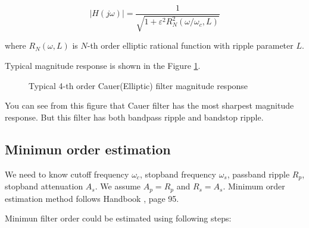 \begin{equation}
 |H(j\omega)|=\frac{1}{\sqrt{1+\varepsilon^2 R^2_N(\omega/\omega_c,L)}}
\end{equation}

where $R_N(\omega,L)$ is $N$-th order elliptic rational function with ripple
parameter $L$.

Typical magnitude response is shown in the Figure \ref{fig:cauer}.

\begin{figure}[!ht]
  \centering
  \caption{Typical 4-th order Cauer(Elliptic) filter magnitude response}
  \label{fig:cauer}
\end{figure}

You can see from this figure that Cauer filter has the most sharpest magnitude
response. But this filter has both bandpass ripple and bandstop ripple. 

\subsection{Minimun order estimation}

We need to know cutoff frequency $\omega_c$, stopband frequency $\omega_s$,
passband ripple $R_p$, stopband attenuation $A_s$. We assume $A_p=R_p$ and
$R_s=A_s$. Minimum order estimation method follows Handbook
\cite{dfd_handbook}, page 95.

Minimun filter order could be estimated using following steps:

